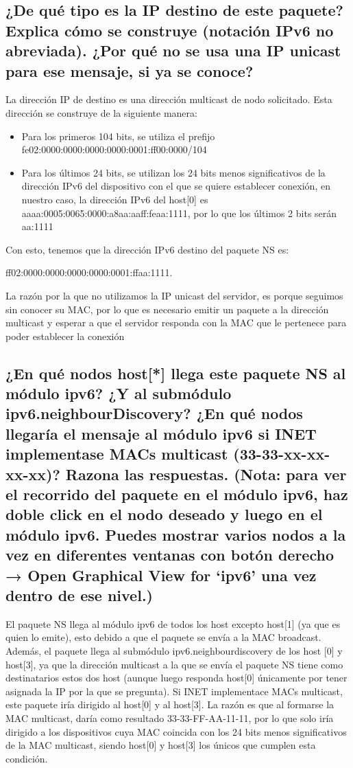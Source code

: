 \subsection{¿De qué tipo es la IP destino de este paquete? Explica cómo se construye (notación IPv6 no abreviada). ¿Por qué no se usa una IP unicast para ese mensaje, si ya se conoce?}
\begin{flushleft}
    La dirección IP de destino es una dirección multicast de nodo solicitado. Esta dirección se construye de la siguiente manera:
\begin{itemize}
    \item Para los primeros 104 bits, se utiliza el prefijo fe02:0000:0000:0000:0000:0001:ff00:0000/104
    \item Para los últimos 24 bits, se utilizan los 24 bits menos significativos de la dirección IPv6 del dispositivo con el que se quiere establecer conexión, en nuestro caso, la dirección IPv6 del host[0] es aaaa:0005:0065:0000:a8aa:aaff:feaa:1111, por lo que los últimos 2 bits serán aa:1111
\end{itemize}
Con esto, tenemos que la dirección IPv6 destino del paquete NS es:

ff02:0000:0000:0000:0000:0001:ffaa:1111.

La razón por la que no utilizamos la IP unicast del servidor, es porque seguimos sin conocer su MAC, por lo que es necesario emitir un paquete a la dirección multicast y esperar a que el servidor responda con la MAC que le pertenece para poder establecer la conexión
\end{flushleft}


\subsection{¿En qué nodos host[*] llega este paquete NS al módulo ipv6? ¿Y al submódulo ipv6.neighbourDiscovery? ¿En qué nodos llegaría el mensaje al módulo ipv6 si INET implementase MACs multicast (33-33-xx-xx-xx-xx)? Razona las respuestas. (Nota: para ver el recorrido del paquete en el módulo ipv6, haz doble click en el nodo deseado y luego en el módulo ipv6. Puedes mostrar varios nodos a la vez en diferentes ventanas con botón derecho → Open Graphical View for ‘ipv6’ una vez dentro de ese nivel.)}
\begin{flushleft}
    El paquete NS llega al módulo ipv6 de todos los host excepto host[1] (ya que es quien lo emite), esto debido a que el paquete se envía a la MAC broadcast. Además, el paquete llega al submódulo ipv6.neighbourdiscovery de los host [0] y host[3], ya que la dirección multicast a la que se envía el paquete NS tiene como destinatarios estos dos host (aunque luego responda host[0] únicamente por tener asignada la IP por la que se pregunta).
    Si INET implementace MACs multicast, este paquete iría dirigido al host[0] y al host[3]. La razón es que al formarse la MAC multicast, daría como resultado 33-33-FF-AA-11-11, por lo que solo iría dirigido a los dispositivos cuya MAC coincida con los 24 bits menos significativos de la MAC multicast, siendo host[0] y host[3] los únicos que cumplen esta condición.
\end{flushleft}

